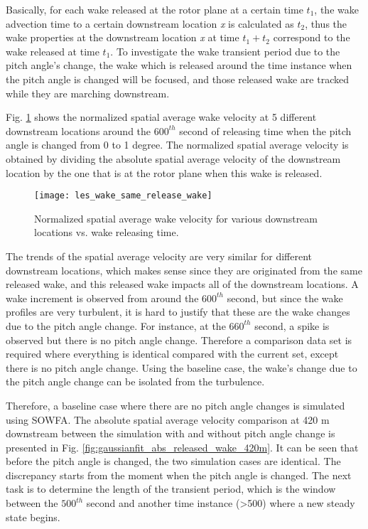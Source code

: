 \documentclass{umthesis}
\begin{document}
Basically, for each wake released at the rotor plane at a certain time $t_1$, the wake advection time to a certain downstream location \textit{x} is calculated as $t_2$, thus the wake properties at the downstream location \textit{x} at time $t_1 + t_2$ correspond to the wake released at time $t_1$. To investigate the wake transient period due to the pitch angle’s change, the wake which is released around the time instance when the pitch angle is changed will be focused, and those released wake are tracked while they are marching downstream.

Fig. \ref{fig:les_wake_same_release_wake} shows the normalized spatial average wake velocity at 5 different downstream locations around the $600^{th}$ second of releasing time when the pitch angle is changed from 0 to 1 degree. The normalized spatial average velocity is obtained by dividing the absolute spatial average velocity of the downstream location by the one that is at the rotor plane when this wake is released. 

\begin{figure}
  \centering
  \texttt{[image: les\_wake\_same\_release\_wake]}
  \caption{Normalized spatial average wake velocity for various downstream locations vs. wake releasing time.}\label{fig:les_wake_same_release_wake}
\end{figure}

The trends of the spatial average velocity are very similar for different downstream locations, which makes sense since they are originated from the same released wake, and this released wake impacts all of the downstream locations. A wake increment is observed from around the $600^{th}$ second, but since the wake profiles are very turbulent, it is hard to justify that these are the wake changes due to the pitch angle change. For instance, at the $660^{th}$ second, a spike is observed but there is no pitch angle change. Therefore a comparison data set is required where everything is identical compared with the current set, except there is no pitch angle change. Using the baseline case, the wake's change due to the pitch angle change can be isolated from the turbulence.

Therefore, a baseline case where there are no pitch angle changes is simulated using SOWFA. The absolute spatial average velocity comparison at 420 m downstream between the simulation with and without pitch angle change is presented in Fig. \ref{fig:gaussianfit_abs_released_wake_420m}. It can be seen that before the pitch angle is changed, the two simulation cases are identical. The discrepancy starts from the moment when the pitch angle is changed. The next task is to determine the length of the transient period, which is the window between the $500^{th}$ second and another time instance (\textgreater500) where a new steady state begins. 
\end{document}
